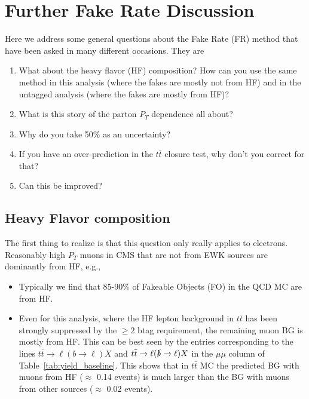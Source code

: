 \section{Further Fake Rate Discussion}
\label{sec:frFAQ}

Here we address some general questions about the 
Fake Rate (FR) method that have been asked in many 
different occasions.  They are
\begin{enumerate}

\item What about the heavy flavor (HF) composition?  How can you
use the same method in this analysis (where the fakes are mostly
not from HF) and in the untagged analysis (where the fakes are 
mostly from HF)?

\item What is this story of the parton $P_T$ dependence all
about?

\item Why do you take 50\% as an uncertainty?

\item If you have an over-prediction in the $t\bar{t}$ 
closure test, why don't you correct for that?

\item Can this be improved?

\end{enumerate}

\subsection{Heavy Flavor composition}
\label{sec:HF}

The first thing to realize is that this question only really 
applies to electrons.  Reasonably high $P_T$
muons in CMS that are not from EWK sources
are dominantly from HF, e.g.,

\begin{itemize}

\item Typically we find that 85-90\% of Fakeable Objects (FO) 
in the QCD MC are from HF. 

\item Even for this analysis, where the HF lepton background
in $t\bar{t}$ has been strongly suppressed by the 
$\geq 2$ btag requirement,
the remaining muon BG is mostly from HF.
This can be best seen by the entries corresponding to the 
lines $t\overline{t}\rightarrow \ell(b\rightarrow \ell)X$
and $t\overline{t}\rightarrow \ell(\slashed{b}\rightarrow \ell)X$
in the $\mu\mu$ column of Table~\ref{tab:yield_baseline}.
This shows that in $t\bar{t}$ MC the predicted BG with 
muons from HF ($\approx$ 0.14 events) is much larger than the 
BG with muons from other sources ($\approx$ 0.02 events).

\end{itemize}

